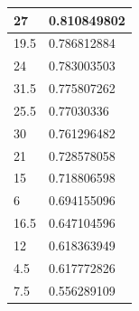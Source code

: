 \begin{table}[H]
\begin{tabular}{|l|l|}
		\rowcolor[HTML]{F8FF00} 
		27                                                        & 0.810849802                                                    \\ \hline
		\rowcolor[HTML]{F8FF00} 
		19.5                                                      & 0.786812884                                                    \\ \hline
		\rowcolor[HTML]{F8FF00} 
		24                                                        & 0.783003503                                                    \\ \hline
		\rowcolor[HTML]{F8FF00} 
		31.5                                                      & 0.775807262                                                    \\ \hline
		\rowcolor[HTML]{F8FF00} 
		25.5                                                      & 0.77030336                                                     \\ \hline
		\rowcolor[HTML]{F8FF00} 
		30                                                        & 0.761296482                                                    \\ \hline
		\rowcolor[HTML]{F8FF00} 
		21                                                        & 0.728578058                                                    \\ \hline
		\rowcolor[HTML]{F8FF00} 
		15                                                        & 0.718806598                                                    \\ \hline
		\rowcolor[HTML]{F8FF00} 
		6                                                         & 0.694155096                                                    \\ \hline
		\rowcolor[HTML]{F8FF00} 
		16.5                                                      & 0.647104596                                                    \\ \hline
		\rowcolor[HTML]{F8FF00} 
		12                                                        & 0.618363949                                                    \\ \hline
		\rowcolor[HTML]{F8FF00} 
		4.5                                                       & 0.617772826                                                    \\ \hline
		\rowcolor[HTML]{F8FF00} 
		7.5                                                       & 0.556289109                                                    \\ \hline

\end{tabular}
\end{table}
